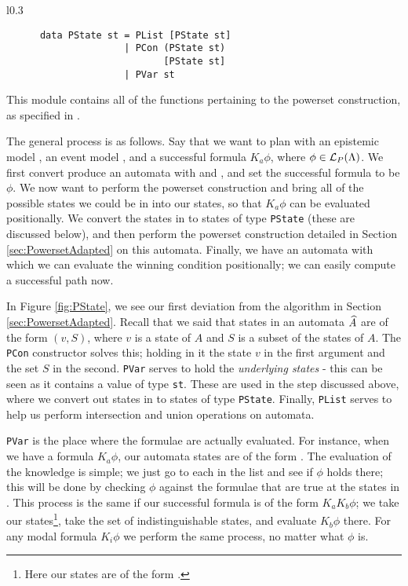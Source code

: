 \documentclass[10pt, a4paper]{report}
\begin{document}
\begin{wrapfigure}{l}{0.3\textwidth}
  \begin{center}
    \begin{verbatim}
      data PState st = PList [PState st] 
                     | PCon (PState st) 
                            [PState st] 
                     | PVar st 
    \end{verbatim}
  \end{center}
  \caption{The  datatype.}
  \label{fig:PState}
\end{wrapfigure}

This module contains all of the functions pertaining to the powerset
construction, as specified in .

The general process is as follows. Say that we want to plan with an epistemic
model , an event model , and a successful formula $K_a \phi$,
where $\phi \in \mathcal{L}_P(\Lambda)$. We first convert produce an \mestar automata
with  and , and set the successful formula to be $\phi$. We now
want to perform the powerset construction and bring all of the possible states
we could be in into our states, so that $K_a \phi$ can be evaluated
positionally. We convert the states in \mestar to states of type
\texttt{PState} (these are discussed below), and then perform the
powerset construction detailed in Section \ref{sec:PowersetAdapted} on this
automata. Finally, we have an automata with which we can evaluate the winning
condition positionally; we can easily compute a successful path now. 

In Figure \ref{fig:PState}, we see our first deviation from the algorithm in
Section \ref{sec:PowersetAdapted}. Recall that we said that states in an
automata $\widehat{A}$ are of the form $(v, S)$, where $v$ is a state of $A$ and $S$
is a subset of the states of $A$. The \texttt{PCon} constructor
solves this; holding in it the state $v$ in the first argument and the set $S$
in the second. \texttt{PVar} serves to hold the \emph{underlying
  states} - this can be seen as it contains a value of type
\texttt{st}. These are used in the step discussed above, where we
convert out states in \mestar to states of type \texttt{PState}.
Finally, \texttt{PList} serves to help us perform intersection and
union operations on automata.

\texttt{PVar} is the place where the formulae are actually
evaluated. For instance, when we have a formula $K_a \phi$, our automata states
are of the form . The evaluation of the knowledge
is simple; we just go to each  in the list and see if $\phi$ holds
there; this will be done by checking $\phi$ against the formulae that are true
at the states in . This process is the same if our successful formula
is of the form $K_a K_b \phi$; we take our states\footnote{Here our states are
  of the form .}, take the set of indistinguishable states, and evaluate $K_b \phi$
there. For any modal formula $K_i \phi$ we perform the same process, no matter
what $\phi$ is.
\end{document}
